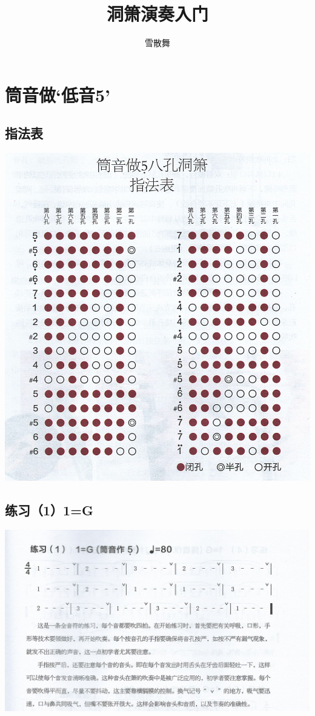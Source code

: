 \documentclass[cn,pad,chinese,chinesefont=nofont]{elegantbook}
\title{洞箫演奏入门}
\author{雪散舞}
\date{\zhtoday}
\begin{document}
\maketitle
\frontmatter
\tableofcontents
\mainmatter

\centering
\chapter{筒音做‘低音5’}
\section{指法表}
\includegraphics[width=\textwidth]{dongxiao/Scan.jpeg}

\section{练习（1）1=G}
\includegraphics[width=\textwidth]{dongxiao/Scan 1-1.jpeg}
\end{document}
